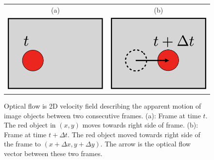 \documentclass[letterpaper,11pt]{article}
\begin{document}
\begin{figure}[hb!]
	\centering
	\begin{tabular}{cc} 
		(a) & (b) \\
		\includegraphics[width=.45\textwidth]{grf/optical-flow-ball-1.png} &
		\includegraphics[width=.45\textwidth]{grf/optical-flow-ball-2.png} 
	\end{tabular}
	\caption{Optical flow is 2D velocity field describing the apparent motion of image objects between two consecutive frames. (a): Frame at time $t$. The red object in $(x,y)$ moves towards right side of frame. (b): Frame at time $t+\Delta t$. The red object moved towards right side of the frame to $(x+\Delta x , y + \Delta y)$. The arrow is the optical flow vector between these two frames.}
	\label{grf:optical-flow-ball}
\end{figure}
  
\end{document}
